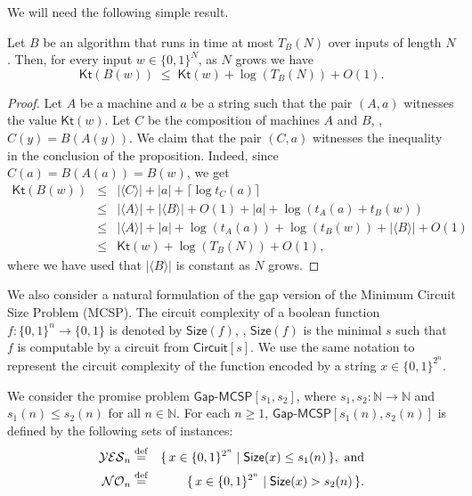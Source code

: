 \documentclass{toc}
\newcommand{\eqdef}{\stackrel{\rm def}{=}}
\newcommand{\gapmcsp}{\mathsf{Gap}$-$\mathsf{MCSP}}
\newcommand{\Kt}{\mathsf{Kt}}
\begin{document}
We will need the following simple result.

\begin{proposition}\label{p:composition}
Let $B$ be an algorithm that runs in time at most $T_B(N)$ over inputs of length $N$. Then, for every input $w \in \{0,1\}^N$, as $N$ grows we have
$$
\Kt(B(w)) \;\leq\;\Kt(w) + \log (T_B(N)) + O(1).
$$
\end{proposition}

\begin{proof}
Let $A$ be a machine and $a$ be a string such that the pair $(A,a)$ witnesses the value $\Kt(w)$. Let $C$ be the composition of machines $A$ and $B$, \ie, $C(y) = B(A(y))$. We claim that the pair $(C,a)$ witnesses the inequality in the conclusion of the proposition. Indeed, since $C(a) = B(A(a)) = B(w)$, we get
\begin{eqnarray}
\Kt(B(w)) & \leq & |\langle C \rangle| + |a| + \lceil \log t_C(a) \rceil \nonumber \\ 
 & \leq & |\langle A \rangle | + |\langle B \rangle| + O(1) + |a| + \log (t_A(a) + t_B(w)) \nonumber  \\
& \leq &  |\langle A \rangle | + |a| + \log (t_A(a)) + \log( t_B(w)) + |\langle B \rangle | + O(1) \nonumber \\
& \leq & \Kt(w) + \log (T_B(N)) + O(1), \nonumber
\end{eqnarray}
where we have used that $|\langle B \rangle |$ is constant as $N$ grows.
\end{proof}

We also consider a natural formulation of the gap version of the Minimum Circuit Size Problem (MCSP). The circuit complexity of a boolean function $f \colon \{0,1\}^n \to \{0,1\}$ is denoted by $\mathsf{Size}(f)$, \ie, $\mathsf{Size}(f)$ is the minimal $s$ such that $f$ is computable by a circuit from $\mathsf{Circuit}[s]$. We use the same notation to represent the circuit complexity of the function encoded by a string $x \in \{0,1\}^{2^n}$.

\begin{definition} \label{d:gapmcsp} We consider the promise problem $\gapmcsp[s_1,s_2]$, where $s_1,s_2 \colon \mathbb{N} \to \mathbb{N}$ and $s_1(n) \le s_2(n)$ for all $n \in \mathbb{N}$. For each $n \geq 1$, $\gapmcsp[s_1(n),s_2(n)]$ is defined by the following sets of instances:
\begin{eqnarray}
\mathcal{YES}_n & \eqdef & \{\,x \in \{0,1\}^{2^n} \mid \mathsf{Size}(x) \leq s_1(n)\,\},~\text{and} \nonumber \\
\mathcal{NO}_n & \eqdef & \{\,x \in \{0,1\}^{2^n} \mid \mathsf{Size}(x) > s_2(n)\,\}. \nonumber
\end{eqnarray}
\end{definition}
\end{document}
